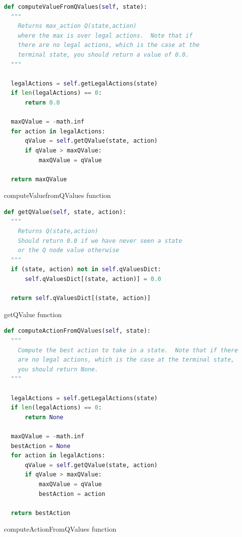 \documentclass{article}
\begin{document}
\begin{table} [ht!]
  \begin{lstlisting}[language=python, frame=tlbr, framesep=6pt, backgroundcolor=\color{light-gray}]
  def computeValueFromQValues(self, state):
  """
    Returns max_action Q(state,action)
    where the max is over legal actions.  Note that if
    there are no legal actions, which is the case at the
    terminal state, you should return a value of 0.0.
  """
  
  legalActions = self.getLegalActions(state)
  if len(legalActions) == 0:
      return 0.0

  maxQValue = -math.inf
  for action in legalActions:
      qValue = self.getQValue(state, action)
      if qValue > maxQValue:
          maxQValue = qValue

  return maxQValue
  \end{lstlisting}
  \caption{computeValuefromQValues function}
\end{table}

\begin{table} [ht!]
  \begin{lstlisting}[language=python, frame=tlbr, framesep=6pt, backgroundcolor=\color{light-gray}]
  def getQValue(self, state, action):
  """
    Returns Q(state,action)
    Should return 0.0 if we have never seen a state
    or the Q node value otherwise
  """
  if (state, action) not in self.qValuesDict:
      self.qValuesDict[(state, action)] = 0.0

  return self.qValuesDict[(state, action)]
  \end{lstlisting}
  \caption{getQValue function}
\end{table}

\begin{table} [ht!]
  \begin{lstlisting}[language=python, frame=tlbr, framesep=6pt, backgroundcolor=\color{light-gray}]
  def computeActionFromQValues(self, state):
  """
    Compute the best action to take in a state.  Note that if there
    are no legal actions, which is the case at the terminal state,
    you should return None.
  """
  
  legalActions = self.getLegalActions(state)
  if len(legalActions) == 0:
      return None

  maxQValue = -math.inf
  bestAction = None
  for action in legalActions:
      qValue = self.getQValue(state, action)
      if qValue > maxQValue:
          maxQValue = qValue
          bestAction = action

  return bestAction
  \end{lstlisting}
  \caption{computeActionFromQValues function}
\end{table}
\end{document}
